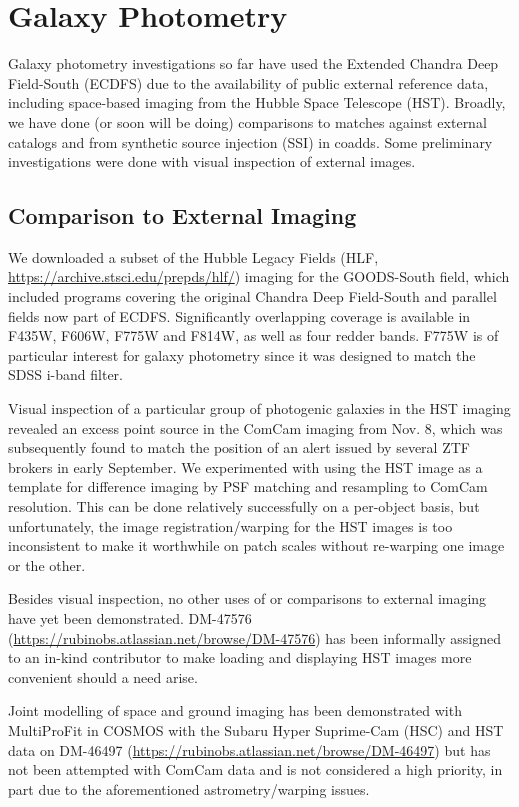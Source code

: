 \section{Galaxy Photometry}
\label{sec:galaxy_photometry}

Galaxy photometry investigations so far have used the Extended Chandra Deep Field-South (ECDFS) due to the availability of public external reference data, including space-based imaging from the Hubble Space Telescope (HST).
Broadly, we have done (or soon will be doing) comparisons to matches against external catalogs and from synthetic source injection (SSI) in coadds.
Some preliminary investigations were done with visual inspection of external images.

\subsection{Comparison to External Imaging}
\label{subsec:galaxy_photometry_external_imaging}

We downloaded a subset of the Hubble Legacy Fields (HLF, \url{https://archive.stsci.edu/prepds/hlf/}) imaging for the GOODS-South field, which included programs covering the original Chandra Deep Field-South and parallel fields now part of ECDFS.
Significantly overlapping coverage is available in F435W, F606W, F775W and F814W, as well as four redder bands.
F775W is of particular interest for galaxy photometry since it was designed to match the SDSS i-band filter.

Visual inspection of a particular group of photogenic galaxies in the HST imaging revealed an excess point source in the ComCam imaging from Nov. 8, which was subsequently found to match the position of an alert issued by several ZTF brokers in early September.
We experimented with using the HST image as a template for difference imaging by PSF matching and resampling to ComCam resolution.
This can be done relatively successfully on a per-object basis, but unfortunately, the image registration/warping for the HST images is too inconsistent to make it worthwhile on patch scales without re-warping one image or the other.

Besides visual inspection, no other uses of or comparisons to external imaging have yet been demonstrated.
DM-47576 (\url{https://rubinobs.atlassian.net/browse/DM-47576}) has been informally assigned to an in-kind contributor to make loading and displaying HST images more convenient should a need arise.

Joint modelling of space and ground imaging has been demonstrated with MultiProFit in COSMOS with the Subaru Hyper Suprime-Cam (HSC) and HST data on DM-46497 (\url{https://rubinobs.atlassian.net/browse/DM-46497}) but has not been attempted with ComCam data and is not considered a high priority, in part due to the aforementioned astrometry/warping issues.


